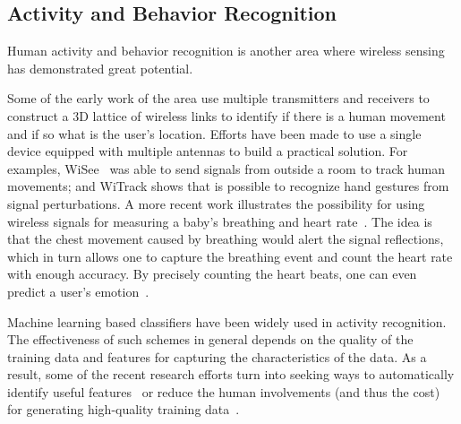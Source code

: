\subsection{Activity and Behavior Recognition}
Human activity and behavior recognition is another area where wireless sensing has demonstrated great potential.

Some of the early work of the area use multiple transmitters and receivers to construct a 3D lattice of wireless links to identify if there
is a human movement and if so what is the user's location. Efforts have been made to use a single device equipped with multiple antennas to
build a practical solution. For examples, WiSee~\cite{WiSee} was able to send signals from outside a room to track human movements; and WiTrack
shows that is possible to recognize hand gestures from signal perturbations. A more recent work illustrates the possibility for using
wireless signals for measuring a baby's breathing and heart rate~\cite{ Smart-homes}. The idea is that the chest movement caused by
breathing would alert the signal reflections, which in turn allows one to capture the breathing event and count the heart rate with enough
accuracy. By precisely counting the heart beats, one can even predict a user's emotion~\cite{Zhao2017Emotion}.

Machine learning based classifiers have been widely used in activity recognition. The effectiveness of such schemes in general depends on
the quality of the training data and features for capturing the characteristics of the data. As a result, some of the recent research
efforts turn into seeking ways to automatically identify useful features~\cite{CrossSense} or reduce the human involvements (and thus the
 cost) for generating high-quality training data~\cite{zhao2018rf}.


